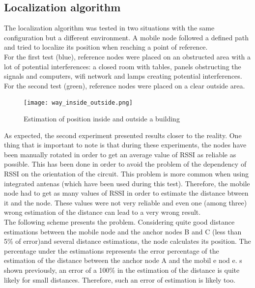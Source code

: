\documentclass[a4paper,10pt]{article}
\begin{document}
\subsection{Localization algorithm}
The localization algorithm was tested in two situations with the same configuration but a different environment. A mobile node followed a defined
path and tried to localize its position when reaching a point of reference.\\
For the first test (blue), reference nodes were placed on an obstructed area with a lot of potential interferences: a closed room with tables, panels 
obstructing the signals and computers, wifi network and lamps creating potential interferences. \\
For the second test (green), reference nodes were placed on a clear outside area.
\begin{figure}[H]
\centering
 \texttt{[image: way\_inside\_outside.png]}
\caption{Estimation of position inside and outside a building}
\end{figure}
\noindent
As expected, the second experiment presented results closer to the reality. One thing that is important to note is that during these experiments,
the nodes have been manually rotated in order to get an average value of RSSI as reliable as possible. This has been done in order to avoid the 
problem of the dependency of RSSI on the orientation of the circuit. This problem is more common when using integrated antenas (which have been
used during this test). Therefore, the mobile  node had to get as many values of RSSI in order to estimate the distance btween
it and the node. These values were not very reliable and even one (among three) wrong estimation of the distance can lead to a very wrong result. \\
The following scheme presents the problem. Considering quite good distance estimations between the mobile node and the anchor nodes B and C (less than 
5\% of error)and several distance estimations, the node calculates its position. The percentage under the estimations represents the error percentage 
of  the estimation of the distance between the anchor node A and the mobil e nod e. s shown previously, an error of a 100\% in the estimation of the                 
 distance  is quite likely for small distances. Therefore, such an error of estimation is likely too.                                          
                            
\end{document}
